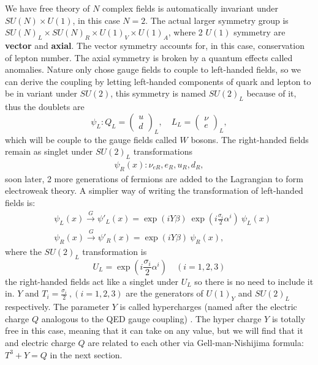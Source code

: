 \documentclass{report}
\numberwithin{equation}{section}
\begin{document}
We have free theory of $N$ complex fields is automatically invariant under $SU(N)\times U(1)$, in this case $N=2$. The actual larger symmetry group is  $SU(N)_L\times SU(N)_R\times U(1)_V\times U(1)_A$, where 2 $U(1)$ symmetry are \textbf{vector} and \textbf{axial}. The vector symmetry accounts for, in this case, conservation of lepton number. The axial symmetry is broken by a quantum effects called anomalies. Nature only chose gauge fields to couple to left-handed fields, so we can derive the coupling by letting left-handed components of quark and lepton to be in variant under $SU(2)$, this symmetry is named $SU(2)_L$ because of it, thus the doublets are
\begin{equation}
\psi_L: Q_L=\begin{pmatrix}
    u\\d
    \end{pmatrix}_L, \quad L_L=\begin{pmatrix}
    \nu\\e
    \end{pmatrix}_L,
\end{equation}
which will be couple to the gauge fields called $W$ bosons. The right-handed fields remain as singlet under $SU(2)_L$ transformations
\begin{align}
\psi_R(x):  \nu_{eR},e_R,u_R,d_R,
\end{align}
soon later, 2 more generations of fermions are added to the Lagrangian to form electroweak theory.
A simplier way of writing the transformation of left-handed fields is:
\begin{align}
&\psi_L(x)\xrightarrow{G}\psi'_L(x)= \exp(i Y\beta) \ \exp(i\frac{\sigma_i}{2}\alpha^i) \ \psi_L(x)\\
&\psi_R(x)\xrightarrow{G}\psi'_R(x)= \exp(iY\beta)  \ \psi_R(x),
\end{align}
where the $SU(2)_L$ transformation is
\begin{equation}
 U_L=\exp(i\frac{\sigma_i}{2}\alpha^i)\quad (i=1,2,3)
 \end{equation}
the right-handed fields act like a singlet under $U_L$ so there is no need to include it in. $Y$ and $T_i=\frac{\sigma_i}{2} \ ,(i=1,2,3)$  are the generators of $U(1)_Y $ and $SU(2)_L $ respectively. The parameter $Y $ is called hypercharges (named after the electric charge $Q$ analogous to the QED gauge coupling) . The hyper charge $Y$ is totally free in this case, meaning that it can take on any value, but we will find that it and electric charge $Q$ are related to each other via Gell-man-Nishijima formula: $T^3 +Y=Q$ in the next section.
\end{document}
